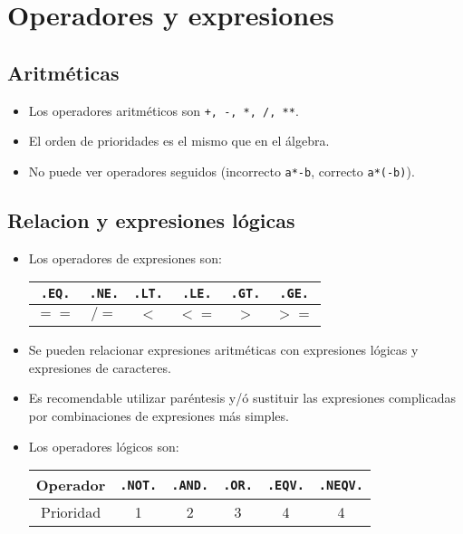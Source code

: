 \section{Operadores y expresiones}

\subsection{Aritméticas}

\begin{itemize}
    \item Los operadores aritméticos son {\tt +, -, *, /, **}.
    \item El orden de prioridades es el mismo que en el álgebra.
    \item No puede ver operadores seguidos (incorrecto {\tt a*-b}, correcto {\tt a*(-b)}).
\end{itemize}

\subsection{Relacion y expresiones lógicas}

\begin{itemize}
    \item Los operadores de expresiones son: 
    \begin{table}[h!] \centering
        \begin{tabular}{|c|c|c|c|c|c|}
            \hline 
            {\tt .EQ.} & {\tt .NE.} & {\tt .LT.} & {\tt .LE.} & {\tt .GT.} & {\tt .GE.} \\ \hline
            $==$ & $/=$ & $<$ & $<=$ & $>$ & $>=$ \\    \hline        
        \end{tabular}
    \end{table}

    \item Se pueden relacionar expresiones aritméticas con expresiones lógicas y expresiones de caracteres. 
    \item Es recomendable utilizar paréntesis y/ó sustituir las expresiones complicadas por combinaciones de expresiones más simples.
    \item Los operadores lógicos son:
    \begin{table}[h!] \centering
        \begin{tabular}{|c|c|c|c|c|c|}
            \hline  Operador &  {\tt .NOT.} & {\tt .AND.} & {\tt .OR.} & {\tt .EQV.} & {\tt .NEQV.}  \\ \hline Prioridad
             & 1 & 2 & 3 & 4 & 4 \\    \hline        
        \end{tabular}
    \end{table}
\end{itemize}